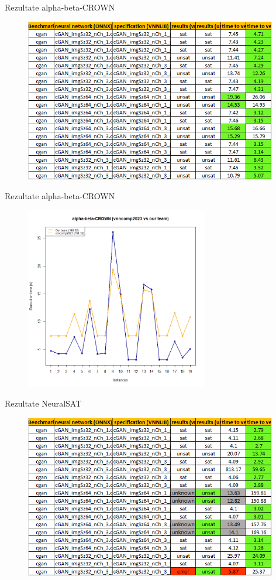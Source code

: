 \begin{frame}{Rezultate alpha-beta-CROWN}
    \begin{figure}[ht]
    \centering
    {\includegraphics[width=11cm]{images/interpretare/abC_comp_vs_us.png}}
    \label{rezultateAlpha}
    \end{figure}
\end{frame}

\begin{frame}{Rezultate alpha-beta-CROWN}
    \begin{figure}[ht]
    \centering
    {\includegraphics[width=8cm]{images/interpretare/abC_us_vs_vnncomp.png}}
    \label{rezultateAlpha}
    \end{figure}
\end{frame}

\begin{frame}{Rezultate NeuralSAT}
    \begin{figure}[ht]
    \centering
    {\includegraphics[width=11cm]{images/interpretare/NeuralSAT_comp_vs_us.png}}
    \label{rezultateNeuralSat}
    \end{figure}
\end{frame}

